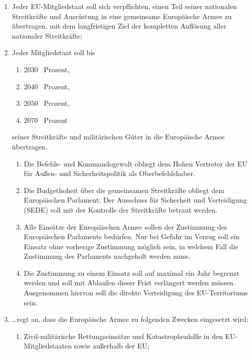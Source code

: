 \documentclass[12pt,a4paper]{article}
\begin{document}
\begin{enumerate}[leftmargin=2em, itemsep=10pt]
    \item Jeder EU-Mitgliedstaat soll sich verpflichten, einen Teil seiner nationalen Streitkräfte und Ausrüstung in eine gemeinsame Europäische Armee zu übertragen, mit dem langfristigen Ziel der kompletten Auflösung aller nationaler Streitkräfte;

    \item Jeder Mitgliedstaat soll bis
    \begin{enumerate}[label=\roman*), leftmargin=1.5em, itemsep=1pt]
        \item 2030 ~Prozent,
        \item 2040 ~Prozent,
        \item 2050 ~Prozent,
        \item 2070 ~Prozent
    \end{enumerate}
    seiner Streitkräfte und militärischen Güter in die Europäische Armee übertragen.

    \begin{enumerate}[label=\alph*), leftmargin=1.5em, itemsep=6pt]
        \item Die Befehls- und Kommandogewalt obliegt dem Hohen Vertreter der EU für Außen- und Sicherheitspolitik als Oberbefehlshaber.

        \item Die Budgethoheit über die gemeinsamen Streitkräfte obliegt dem Europäischen Parlament. Der Ausschuss für Sicherheit und Verteidigung (SEDE) soll mit der Kontrolle der Streitkräfte betraut werden.

        \item Alle Einsätze der Europäischen Armee sollen der Zustimmung des Europäischen Parlaments bedürfen. Nur bei Gefahr im Verzug soll ein Einsatz ohne vorherige Zustimmung möglich sein, in welchem Fall die Zustimmung des Parlaments nachgeholt werden muss.

        \item Die Zustimmung zu einem Einsatz soll auf maximal ein Jahr begrenzt werden und soll mit Ablaufen dieser Frist verlängert werden müssen. Ausgenommen hiervon soll die direkte Verteidigung des EU-Territoriums sein.
    \end{enumerate}

    \item \ldots regt an, dass die Europäische Armee zu folgenden Zwecken eingesetzt wird:
    \begin{enumerate}[label=\alph*), leftmargin=1.5em, itemsep=6pt]
        \item Zivil-militärische Rettungseinsätze und Katastrophenhilfe in den EU-Mitgliedstaaten sowie außerhalb der EU;


\end{enumerate}
\end{enumerate}
\end{document}
